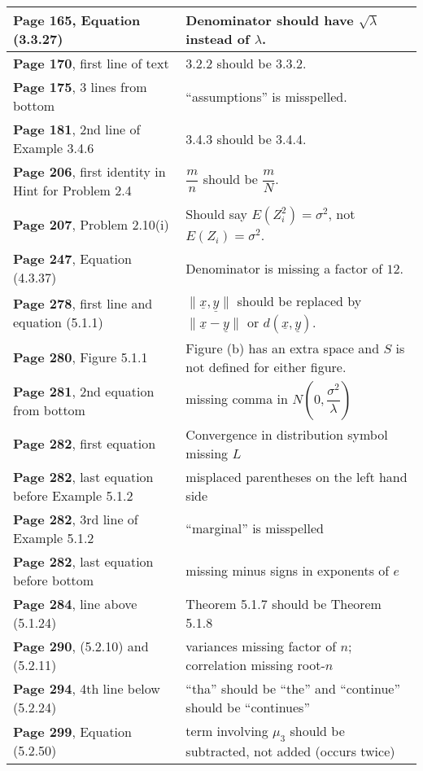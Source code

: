 \documentclass[10pt, a4paper]{article}
\begin{document}
\begin{longtable}{|R{.40\textwidth}|R{.55\textwidth}|}
\textbf{Page 165}, Equation (3.3.27) & Denominator should have $\sqrt{\lambda}$ instead of $\lambda$. \\ \hline
\textbf{Page 170}, first line of text & 3.2.2 should be 3.3.2. \\ \hline
\textbf{Page 175}, 3 lines from bottom & ``assumptions'' is misspelled. \\ \hline
\textbf{Page 181}, 2nd line of Example 3.4.6 & 3.4.3 should be 3.4.4. \\ \hline
\textbf{Page 206}, first identity in Hint for Problem 2.4 & $\dfrac{m}{n}$ should be $\dfrac{m}{N}$. \\ \hline
\textbf{Page 207}, Problem 2.10(i) & Should say $E(Z_i^2)=\sigma^2$, not $E(Z_i)=\sigma^2$. \\ \hline
\textbf{Page 247}, Equation (4.3.37) & Denominator is missing a factor of $12$. \\ \hline
\textbf{Page 278}, first line and equation (5.1.1) & $\|\underline x, \underline y\|$ should be replaced by $\|\underline x-\underline y\|$ or $d(\underline x,\underline y)$. \\ \hline
\textbf{Page 280}, Figure 5.1.1 & Figure (b) has an extra space and $S$ is not defined for either figure. \\ \hline
\textbf{Page 281}, 2nd equation from bottom & missing comma in $N\left(0,\dfrac{\sigma^2}{\lambda}\right)$ \\ \hline
\textbf{Page 282}, first equation & Convergence in distribution symbol missing $L$ \\ \hline
\textbf{Page 282}, last equation before Example 5.1.2 & misplaced parentheses on the left hand side \\ \hline
\textbf{Page 282}, 3rd line of Example 5.1.2 & ``marginal'' is misspelled \\ \hline
\textbf{Page 282}, last equation before bottom & missing minus signs in exponents of $e$ \\ \hline
\textbf{Page 284}, line above (5.1.24) & Theorem 5.1.7 should be Theorem 5.1.8 \\ \hline
\textbf{Page 290}, (5.2.10) and (5.2.11) & variances missing factor of $n$; correlation missing root-$n$ \\ \hline
\textbf{Page 294}, 4th line below (5.2.24) & ``tha'' should be ``the'' and ``continue'' should be ``continues'' \\ \hline
\textbf{Page 299}, Equation (5.2.50) & term involving $\mu_3$ should be subtracted, not added (occurs twice) \\ \hline

\end{longtable}
\end{document}
